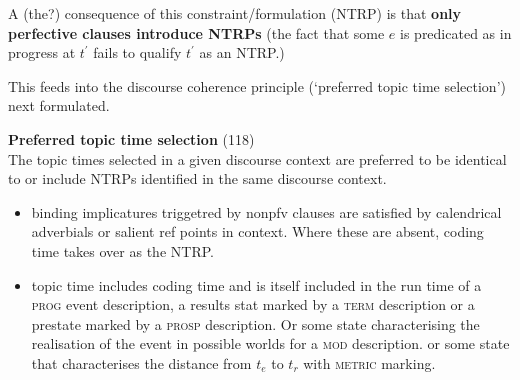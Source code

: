 \documentclass[10pt]{article}
\begin{document}
A (the?) consequence of this constraint/formulation (NTRP) is that \textbf{only perfective clauses introduce NTRPs} (the fact that some $e$ is predicated as in progress at $t^\prime$ fails to qualify $t^\prime$ as an NTRP.)

This feeds into the discourse coherence principle (`preferred topic time selection') next formulated.

\pex \textbf{Preferred topic time selection} (118)\\
The topic times selected in a given discourse context are preferred to be identical to or include NTRPs identified in the same discourse context.\xe

\begin{itemize}
\item binding implicatures triggetred by nonpfv clauses are satisfied by calendrical adverbials or salient ref points in context. Where these are absent, coding time takes over as the NTRP.
\item topic time includes coding time and is itself included in the run time of a \textsc{prog} event description, a results stat marked by a \textsc{term} description or a prestate marked by a \textsc{prosp} description. Or some state characterising the realisation of the event in possible worlds for a \textsc{mod} description. or some state that characterises the distance from $t_e$ to $t_r$ with \textsc{metric} marking. 
\end{itemize}
\end{document}
